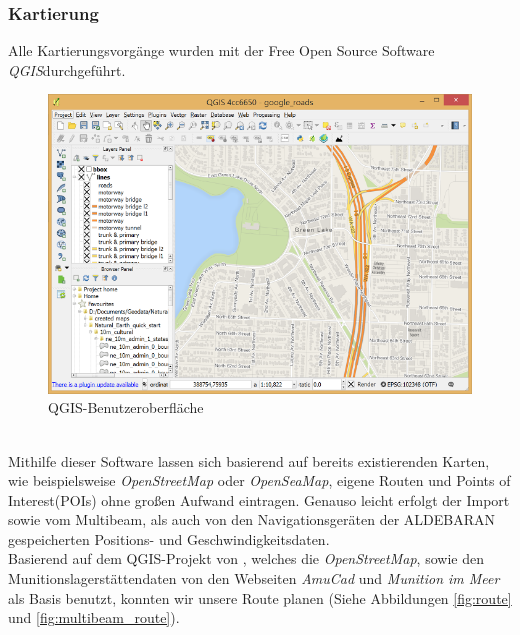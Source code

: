 \subsubsection{Kartierung}
\label{kartierung}
Alle Kartierungsvorgänge wurden mit der Free Open Source Software\\ \emph{QGIS}\cite{qgis}durchgeführt.
\begin{figure}[ht]
    \centering
    \includegraphics[width=.4\linewidth]{Bilder/QGIS/about-screenshot.png}
    \caption[fig:qgisabout]{QGIS-Benutzeroberfläche}
\end{figure}
\\Mithilfe dieser Software lassen sich basierend auf bereits existierenden Karten, 
wie beispielsweise \emph{OpenStreetMap}\cite{ostrm} oder \emph{OpenSeaMap}\cite{oseam}, eigene Routen und Points of \\Interest(POIs) ohne großen 
Aufwand eintragen. Genauso leicht erfolgt der Import sowie vom Multibeam,  als auch von den Navigationsgeräten der ALDEBARAN gespeicherten 
Positions- und Geschwindigkeitsdaten.\\


Basierend auf dem QGIS-Projekt von \jens, welches die \emph{OpenStreetMap}, sowie den Munitionslagerstättendaten von den Webseiten
\emph{AmuCad}\cite{amucad} und \emph{Munition im Meer}\cite{muninmeer}
als Basis benutzt, konnten wir unsere Route planen (Siehe Abbildungen \ref{fig:route} und \ref{fig:multibeam_route}).

